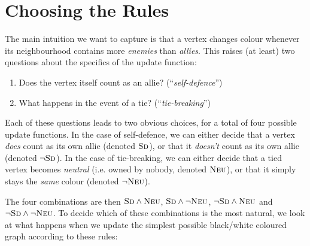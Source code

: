 \documentclass{article}
\theoremstyle{plain}
\theoremstyle{definition}
\begin{document}
\section{Choosing the Rules}

\newcommand{\selfDef}{\textsc{Sd}}
\newcommand{\nselfDef}{\neg \textsc{Sd}}
\newcommand{\tieNeu}{\textsc{Neu}}
\newcommand{\ntieNeu}{\neg \textsc{Neu}}

The main intuition we want to capture is that a vertex changes colour whenever its neighbourhood contains more \emph{enemies} than \emph{allies}. This raises (at least) two questions about the specifics of the update function:

\begin{enumerate}
  \item Does the vertex itself count as an allie? (``\emph{self-defence}'')
  \item What happens in the event of a tie? (``\emph{tie-breaking}'')
\end{enumerate}

Each of these questions leads to two obvious choices, for a total of four possible update functions. In the case of self-defence, we can either decide that a vertex \emph{does} count as its own allie (denoted $\selfDef$), or that it \emph{doesn't} count as its own allie (denoted $\nselfDef$). In the case of tie-breaking, we can either decide that a tied vertex becomes \emph{neutral} (i.e. owned by nobody, denoted $\tieNeu$), or that it simply stays the \emph{same} colour (denoted $\ntieNeu$).

The four combinations are then $\selfDef \wedge \tieNeu$, $\selfDef \wedge \ntieNeu$, $\nselfDef \wedge \tieNeu$ and $\nselfDef \wedge \ntieNeu$. To decide which of these combinations is the most natural, we look at what happens when we update the simplest possible black/white coloured graph according to these rules:

\begin{center}
\end{center}
\end{document}
